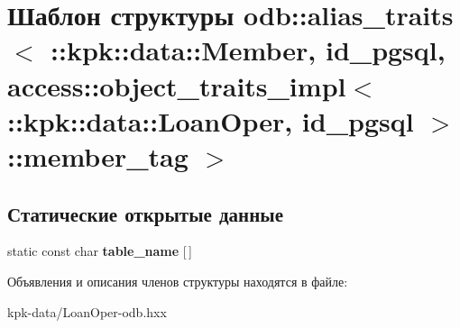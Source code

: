 \hypertarget{structodb_1_1alias__traits_3_01_01_01_01_01_01_01_01_01_01_01_01_01_01_01_01_01_01_1_1kpk_1_1dat92de7c482c60b2c0f5e21eb4f0b0010a}{}\section{Шаблон структуры odb\+:\+:alias\+\_\+traits$<$ \+:\+:kpk\+:\+:data\+:\+:Member, id\+\_\+pgsql, access\+:\+:object\+\_\+traits\+\_\+impl$<$ \+:\+:kpk\+:\+:data\+:\+:Loan\+Oper, id\+\_\+pgsql $>$\+:\+:member\+\_\+tag $>$}
\label{structodb_1_1alias__traits_3_01_01_01_01_01_01_01_01_01_01_01_01_01_01_01_01_01_01_1_1kpk_1_1dat92de7c482c60b2c0f5e21eb4f0b0010a}
\subsection*{Статические открытые данные}
\begin{DoxyCompactItemize}
\item 
static const char {\bfseries table\+\_\+name} \mbox{[}$\,$\mbox{]}\hypertarget{structodb_1_1alias__traits_3_01_01_01_01_01_01_01_01_01_01_01_01_01_01_01_01_01_01_1_1kpk_1_1dat92de7c482c60b2c0f5e21eb4f0b0010a_a3fca209aacb7e452a758d8f0d4532993}{}\label{structodb_1_1alias__traits_3_01_01_01_01_01_01_01_01_01_01_01_01_01_01_01_01_01_01_1_1kpk_1_1dat92de7c482c60b2c0f5e21eb4f0b0010a_a3fca209aacb7e452a758d8f0d4532993}

\end{DoxyCompactItemize}


Объявления и описания членов структуры находятся в файле\+:\begin{DoxyCompactItemize}
\item 
kpk-\/data/Loan\+Oper-\/odb.\+hxx\end{DoxyCompactItemize}
